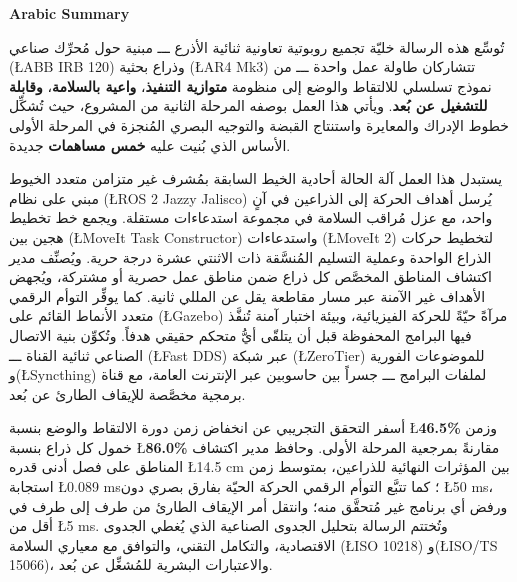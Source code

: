 \clearpage
\thispagestyle{fancy}
\begin{center}
    {\Large \textbf{Arabic Summary}}
\end{center}


\begin{arabtext}
تُوسِّع هذه الرسالة خليّة تجميع روبوتية تعاونية ثنائية الأذرع ـــ مبنية حول مُحرِّك صناعي (\L{ABB IRB 120}) وذراع بحثية (\L{AR4 Mk3}) تتشاركان طاولة عمل واحدة ـــ من نموذج تسلسلي للالتقاط والوضع إلى منظومة \textbf{متوازية التنفيذ}، \textbf{واعية بالسلامة}، \textbf{وقابلة للتشغيل عن بُعد}. ويأتي هذا العمل بوصفه المرحلة الثانية من المشروع، حيث تُشكِّل خطوط الإدراك والمعايرة واستنتاج القبضة والتوجيه البصري المُنجزة في المرحلة الأولى الأساس الذي بُنيت عليه \textbf{خمس مساهمات} جديدة.

يستبدل هذا العمل آلة الحالة أحادية الخيط السابقة بمُشرف غير متزامن متعدد الخيوط مبني على نظام (\L{ROS 2 Jazzy Jalisco}) يُرسل أهداف الحركة إلى الذراعين في آنٍ واحد، مع عزل مُراقب السلامة في مجموعة استدعاءات مستقلة. ويجمع خط تخطيط هجين بين (\L{MoveIt Task Constructor}) واستدعاءات (\L{MoveIt 2}) لتخطيط حركات الذراع الواحدة وعملية التسليم المُنسَّقة ذات الاثنتي عشرة درجة حرية. ويُصنِّف مدير اكتشاف المناطق المخصَّص كل ذراع ضمن مناطق عمل حصرية أو مشتركة، ويُجهض الأهداف غير الآمنة عبر مسار مقاطعة يقل عن المللي ثانية. كما يوفِّر التوأم الرقمي متعدد الأنماط القائم على (\L{Gazebo}) مرآةً حيّةً للحركة الفيزيائية، وبيئة اختبار آمنة تُنفَّذ فيها البرامج المحفوظة قبل أن يتلقّى أيُّ متحكم حقيقي هدفاً. وتُكوِّن بنية الاتصال الصناعي ثنائية القناة ـــ (\L{Fast DDS}) عبر شبكة (\L{ZeroTier}) للموضوعات الفورية و(\L{Syncthing}) لملفات البرامج ـــ جسراً بين حاسوبين عبر الإنترنت العامة، مع قناة برمجية مخصَّصة للإيقاف الطارئ عن بُعد.

أسفر التحقق التجريبي عن انخفاض زمن دورة الالتقاط والوضع بنسبة \L{\textbf{46.5\%}} وزمن خمول كل ذراع بنسبة \L{\textbf{86.0\%}} مقارنةً بمرجعية المرحلة الأولى. وحافظ مدير اكتشاف المناطق على فصل أدنى قدره \L{14.5 cm} بين المؤثرات النهائية للذراعين، بمتوسط زمن استجابة \L{0.089 ms}؛ كما تتبَّع التوأم الرقمي الحركة الحيّة بفارق بصري دون \L{50 ms}، ورفض أي برنامج غير مُتحقَّق منه؛ وانتقل أمر الإيقاف الطارئ من طرف إلى طرف في أقل من \L{5 ms}. وتُختتم الرسالة بتحليل الجدوى الصناعية الذي يُغطي الجدوى الاقتصادية، والتكامل التقني، والتوافق مع معياري السلامة (\L{ISO 10218}) و(\L{ISO/TS 15066})، والاعتبارات البشرية للمُشغِّل عن بُعد.
\end{arabtext}
